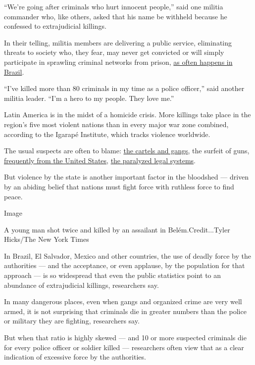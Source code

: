 ``We're going after criminals who hurt innocent people,'' said one
militia commander who, like others, asked that his name be withheld
because he confessed to extrajudicial killings.

In their telling, militia members are delivering a public service,
eliminating threats to society who, they fear, may never get convicted
or will simply participate in sprawling criminal networks from prison,
\href{https://www.nytimes.com/2006/05/30/world/americas/30brazil.html}{as
often happens in Brazil}.

``I've killed more than 80 criminals in my time as a police officer,''
said another militia leader. ``I'm a hero to my people. They love me.''

Latin America is in the midst of a homicide crisis. More killings take
place in the region's five most violent nations than in every major war
zone combined, according to the Igarapé Institute, which tracks violence
worldwide.

The usual suspects are often to blame:
\href{https://www.nytimes.com/2019/12/14/world/americas/sicario-mexico-drug-cartels.html}{the
cartels and gangs}, the surfeit of guns,
\href{https://www.nytimes.com/2019/08/25/world/americas/one-handgun-9-murders-how-american-firearms-cause-carnage-abroad.html}{frequently
from the United States},
\href{https://www.nytimes.com/2019/08/18/world/americas/guatemala-violence-women-asylum.html}{the
paralyzed legal systems}.

But violence by the state is another important factor in the bloodshed
--- driven by an abiding belief that nations must fight force with
ruthless force to find peace.

Image

A young man shot twice and killed by an assailant in
Belém.Credit...Tyler Hicks/The New York Times

In Brazil, El Salvador, Mexico and other countries, the use of deadly
force by the authorities --- and the acceptance, or even applause, by
the population for that approach --- is so widespread that even the
public statistics point to an abundance of extrajudicial killings,
researchers say.

In many dangerous places, even when gangs and organized crime are very
well armed, it is not surprising that criminals die in greater numbers
than the police or military they are fighting, researchers say.

But when that ratio is highly skewed --- and 10 or more suspected
criminals die for every police officer or soldier killed --- researchers
often view that as a clear indication of excessive force by the
authorities.

